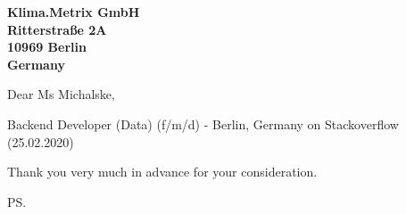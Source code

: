 \documentclass[a4paper]{cover-letter}
\begin{document}
\longindentation=0pt

\newcommand{\companyName}{Klima.Metrix GmbH}

\begin{letter}{\bfseries \companyName\\Ritterstraße 2A\\10969 Berlin\\Germany}


\date{Berlin, \today}

\opening{Dear Ms Michalske,}{Backend Developer (Data) (f/m/d) - Berlin, Germany on Stackoverflow (25.02.2020)}



%


\closing{ Thank you very much in advance for your consideration.}
\vspace{20pt}
\ps

\vspace{\fill}

\end{letter}
\end{document}
